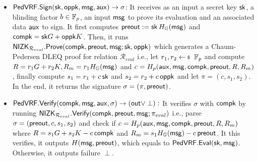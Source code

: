 \begin{itemize}
	\item ${\mathsf{PedVRF}}.{\mathsf{Sign}}(\mathsf{sk},\mathsf{oppk},\mathsf{msg},\mathsf{aux}) \rightarrow \sigma$: It receives as an input a secret key $ \mathsf{sk} $, a blinding factor $ b \in \mathbb{F}_p $, an input $ \mathsf{msg} $ to prove its evaluation and an associated data $ \mathsf{aux} $ to sign.
	It first computes ${\mathsf{preout}} := \mathsf{sk} \, H_{{\mathbb{G}}}(\mathsf{msg})$ and $ \mathsf{compk} = \mathsf{sk} G + \mathsf{oppk}K $. Then, it runs ${\mathsf{NIZK}}_{\mathcal{R}_{eval}}.{\mathsf{Prove}}(\mathsf{compk}, {\mathsf{preout}}, \mathsf{msg};\mathsf{sk},\mathsf{oppk})  $ which generates a Chaum-Pedersen DLEQ proof
	for relation $\mathcal{R}_{eval}$ i.e.,
	let $r_1,r_2 \leftsample \F_p$
	and compute $R = r_1 G + r_2 K, R_m = r_1 H_{{\mathbb{G}}}(\mathsf{msg}) $ and $c = H_p(\mathsf{aux},\mathsf{msg},\mathsf{compk},{\mathsf{preout}},R,R_m)$, finally compute $s_1 = r_1 + c \, \mathsf{sk}$ and $s_2 = r_2 + c \, \mathsf{oppk}$ and let $ \pi = (c,s_1,s_2) $.
	In the end, it returns the signature $\sigma = (\pi, {\mathsf{preout}}) $.
	
	\item ${\mathsf{PedVRF}}.{\mathsf{Verify}}(\mathsf{compk},\mathsf{msg},\mathsf{aux},\sigma) \rightarrow ({\mathsf{out}} \vee \perp):$ 
	It verifies $ \sigma $ with  $ \mathsf{compk} $ by running  $ {\mathsf{NIZK}}_{\mathcal{R}_{eval}}.{\mathsf{Verify}}(\mathsf{compk},{\mathsf{preout}},\mathsf{msg}; \pi_{eval} ) $ i.e.,
	parse $\sigma = ({\mathsf{preout}},c,s_1,s_2) $ and check if  
	$c = H_p(\mathsf{aux},\mathsf{msg},\mathsf{compk},{\mathsf{preout}},R,R_m)$ where  $ R = s_1 G + s_2 K - c \, \mathsf{compk}$ 
	and $ R_m = s_1 H_{{\mathbb{G}}}(\mathsf{msg}) - c \, {\mathsf{preout}}$.
	It this verifies, it outputs $H(\mathsf{msg},{\mathsf{preout}})$, which equals to ${\mathsf{PedVRF}}.{\mathsf{Eval}}(\mathsf{sk},\mathsf{msg})$. Otherwise, it outputs failure $\perp$.
\end{itemize}







